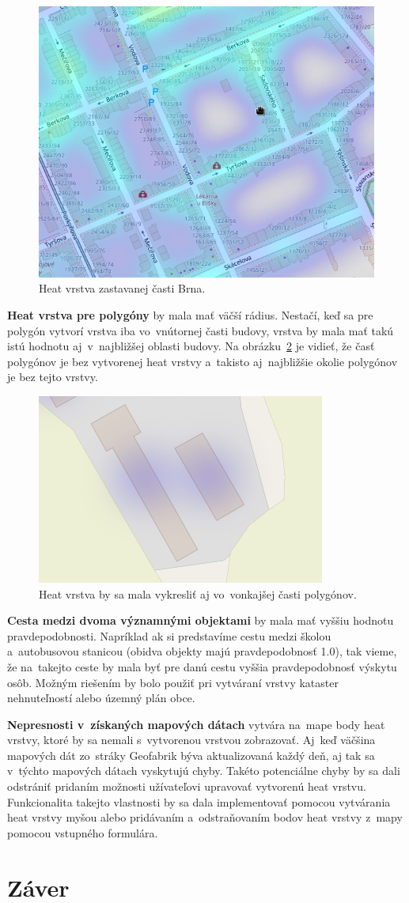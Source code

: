 \begin{figure}[ht]
    \centering
    \includegraphics[width=0.6\linewidth]{obrazky-figures/brno-zastavana-oblast.png}
    \caption{Heat vrstva zastavanej časti Brna.}
    \label{fig:brno-zastavana-oblast}
\end{figure}

\textbf{Heat vrstva pre polygóny} by mala mať väčší rádius. Nestačí, keď sa pre polygón vytvorí vrstva iba vo~vnútornej časti budovy, vrstva by mala mať takú istú hodnotu aj~v~najbližšej oblasti budovy. Na obrázku~\ref{fig:nechov-bad-heatmap} je vidieť, že časť polygónov je bez vytvorenej heat vrstvy a~takisto aj~najbližšie okolie polygónov je bez tejto vrstvy.

\begin{figure}[ht]
    \centering
    \includegraphics[width=0.3\linewidth]{obrazky-figures/nechov-zle-vykreslenie.png}
    \caption{Heat vrstva by sa mala vykresliť aj vo~vonkajšej časti polygónov.}
    \label{fig:nechov-bad-heatmap}
\end{figure}

\textbf{Cesta medzi dvoma významnými objektami} by mala mať vyššiu hodnotu pravdepodobnosti. Napríklad ak si predstavíme cestu medzi školou a~autobusovou stanicou (obidva objekty majú pravdepodobnosť 1.0), tak vieme, že na~takejto ceste by mala byť pre danú cestu vyššia pravdepodobnosť výskytu osôb. Možným riešením by bolo použiť pri vytváraní vrstvy kataster nehnuteľností alebo územný plán obce.

\textbf{Nepresnosti v~získaných mapových dátach} vytvára na~mape body heat vrstvy, ktoré by sa nemali s~vytvorenou vrstvou zobrazovať. Aj~keď väčšina mapových dát zo~stráky Geofabrik býva aktualizovaná  
každý deň, aj tak sa v~týchto mapových dátach vyskytujú chyby. Takéto potenciálne chyby by sa dali odstrániť pridaním možnosti užívateľovi upravovať vytvorenú heat vrstvu. Funkcionalita takejto vlastnosti by sa dala implementovať pomocou vytvárania heat vrstvy myšou alebo pridávaním a~odstraňovaním bodov heat vrstvy z~mapy pomocou vstupného formulára.



\chapter{Záver}
\label{zaver}
